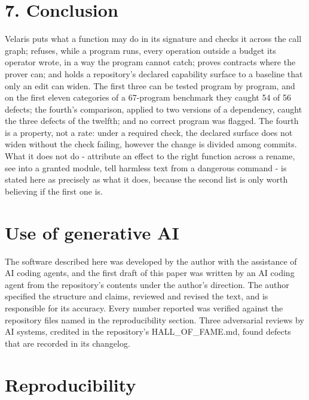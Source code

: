 \documentclass[
]{article}
\begin{document}
\section{7. Conclusion}\label{conclusion}

Velaris puts what a function may do in its signature and checks it
across the call graph; refuses, while a program runs, every operation
outside a budget its operator wrote, in a way the program cannot catch;
proves contracts where the prover can; and holds a repository's declared
capability surface to a baseline that only an edit can widen. The first
three can be tested program by program, and on the first eleven
categories of a 67-program benchmark they caught 54 of 56 defects; the
fourth's comparison, applied to two versions of a dependency, caught the
three defects of the twelfth; and no correct program was flagged. The
fourth is a property, not a rate: under a required check, the declared
surface does not widen without the check failing, however the change is
divided among commits. What it does not do - attribute an effect to the
right function across a rename, see into a granted module, tell harmless
text from a dangerous command - is stated here as precisely as what it
does, because the second list is only worth believing if the first one
is.

\section{Use of generative AI}\label{use-of-generative-ai}

The software described here was developed by the author with the
assistance of AI coding agents, and the first draft of this paper was
written by an AI coding agent from the repository's contents under the
author's direction. The author specified the structure and claims,
reviewed and revised the text, and is responsible for its accuracy.
Every number reported was verified against the repository files named in
the reproducibility section. Three adversarial reviews by AI systems,
credited in the repository's HALL\_OF\_FAME.md, found defects that are
recorded in its changelog.

\section{Reproducibility}\label{reproducibility}
\end{document}
